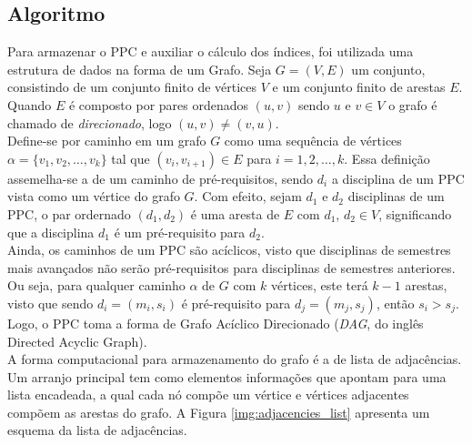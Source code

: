 \documentclass[a4paper, 12pt]{article}
\begin{document}
\subsection*{Algoritmo}

Para armazenar o PPC e auxiliar o cálculo dos índices, foi utilizada uma estrutura de dados na forma de um Grafo. Seja $G = (V, E)$ um conjunto, consistindo 
de um conjunto finito de vértices $V$ e um conjunto finito de arestas $E$. Quando $E$ é composto por pares ordenados $(u, v)$ sendo $u$ e $v \in V$ o grafo é 
chamado de \textit{direcionado}, logo $(u, v) \neq (v, u)$. \\

Define-se por caminho em um grafo $G$ como uma sequência de vértices $\alpha = \{ v_1, v_2, \dots, v_k \}$ tal que $(v_i, v_{i+1}) \in E$ para $i = 1, 2, \dots, k$.
Essa definição assemelha-se a de um caminho de pré-requisitos, sendo $d_i$ a disciplina de um PPC vista como um vértice do grafo $G$. Com efeito, sejam $d_1$ e 
$d_2$ disciplinas de um PPC, o par ordernado $(d_1, d_2)$ é uma aresta de $E$ com $d_1$, $d_2 \in V$, significando que a disciplina $d_1$ é um pré-requisito 
para $d_2$. \\

Ainda, os caminhos de um PPC são acíclicos, visto que disciplinas de semestres mais avançados não serão pré-requisitos para disciplinas de semestres 
anteriores. Ou seja, para qualquer caminho $\alpha$ de $G$ com $k$ vértices, este terá $k-1$ arestas, visto que sendo $d_i=(m_i, s_i)$ é pré-requisito para 
$d_j=(m_j, s_j)$, então $s_i > s_j$. Logo, o PPC toma a forma de Grafo Acíclico Direcionado (\textit{DAG}, do inglês Directed Acyclic Graph). \\

A forma computacional para armazenamento do grafo é a de lista de adjacências. Um arranjo principal tem como elementos informações que apontam para uma 
lista encadeada, a qual cada nó compõe um vértice e vértices adjacentes compõem as arestas do grafo. A Figura \ref{img:adjacencies_list} apresenta um 
esquema da lista de adjacências. \\
\end{document}

